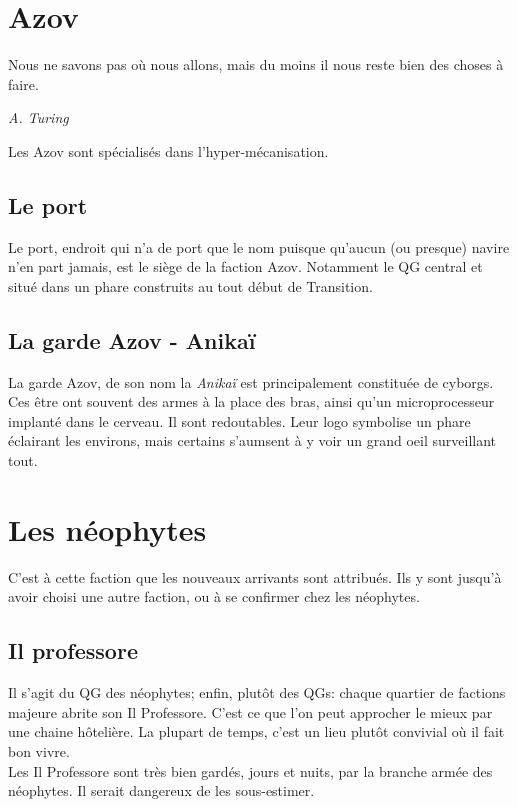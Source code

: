 \documentclass{book}
\begin{document}
\section{Azov}
\epigraph{Nous ne savons pas où nous allons, mais du moins il nous reste bien des choses à faire.}{\textit{A. Turing}}
Les Azov sont spécialisés dans l'hyper-mécanisation. 

\subsection{Le port}
Le port, endroit qui n'a de port que le nom puisque qu'aucun (ou presque) navire n'en part jamais, est le siège de la faction Azov. Notamment le QG central et situé dans un phare construits au tout début de Transition.

\subsection{La garde Azov - Anikaï}
La garde Azov, de son nom la \emph{Anikaï} est principalement constituée de cyborgs. Ces être ont souvent des armes à la place des bras, ainsi qu'un microprocesseur implanté dans le cerveau. Il sont redoutables. Leur logo symbolise un phare éclairant les environs, mais certains s'aumsent à y voir un grand oeil surveillant tout.
\begin{figure}[H]
    \centering
    \def\svgwidth{10em}
    
\end{figure}

\hypertarget{neophytes}{\section{Les néophytes}}
C'est à cette faction que les nouveaux arrivants sont attribués. Ils y sont jusqu'à avoir choisi une autre faction, ou à se confirmer chez les néophytes.

\subsection{Il professore}
Il s'agit du QG des néophytes; enfin, plutôt des QGs: chaque quartier de factions majeure abrite son Il Professore. C'est ce que l'on peut approcher le mieux par une chaine hôtelière. La plupart de temps, c'est un lieu plutôt convivial où il fait bon vivre. 
\\
Les Il Professore sont très bien gardés, jours et nuits, par la branche armée des néophytes. Il serait dangereux de les sous-estimer.
\end{document}
